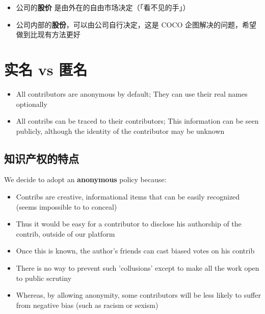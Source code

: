 \documentclass[12pt, orivec, fleqn]{article}
\newcommand{\cc}[2]{#1}
\newcommand{\cc}[2]{#2}
\begin{document}
\begin{itemize}
	\item \cc{公司的\textbf{股价} 是由外在的自由市场决定（「看不见的手」）}
	{A company's \textbf{stock prices} are determined externally by the free-market (``invisible hand'')}

	\item \cc{公司内部的\textbf{股份}，可以由公司自行决定，这是 COCO 企图解决的问题，希望做到比现有方法更好}
	{How the company distributes its \textbf{shares} are decided internally;  This is where COCO tries to innovate}
\end{itemize}

\secttoc
\section{\cc{实名 vs 匿名}{Real-name vs anonymous}}

\begin{itemize}
	\item All contributors are anonymous by default;  They can use their real names optionally
	
	\item All contribs can be traced to their contributors;  This information can be seen publicly, although the identity of the contributor may be unknown
\end{itemize}

\secttoc
\subsection{\cc{知识产权的特点}{Uniqueness of intellectual properties}}

We decide to adopt an \textbf{anonymous} policy because:
\begin{itemize}
	\item Contribs are creative, informational items that can be easily recognized (seems impossible to to conceal)
	\item Thus it would be easy for a contributor to disclose his authorship of the contrib, outside of our platform
	\item Once this is known, the author's friends can cast biased votes on his contrib
	\item There is no way to prevent such 'collusions' except to make all the work open to public scrutiny
	\item Whereas, by allowing anonymity, some contributors will be less likely to suffer from negative bias (such as racism or sexism)
\end{itemize}
\end{document}
